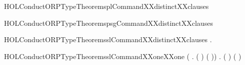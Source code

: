 \begin{SaveVerbatim}{HOLConductORPTypeTheoremsplCommandXXdistinctXXclauses}
\HOLTokenTurnstile{}  \HOLSymConst{\HOLTokenNotEqual{}}  \HOLSymConst{\HOLTokenConj{}}  \HOLSymConst{\HOLTokenNotEqual{}}  \HOLSymConst{\HOLTokenConj{}}
    \HOLSymConst{\HOLTokenNotEqual{}}  \HOLSymConst{\HOLTokenConj{}}  \HOLSymConst{\HOLTokenNotEqual{}}  \HOLSymConst{\HOLTokenConj{}}
    \HOLSymConst{\HOLTokenNotEqual{}}  \HOLSymConst{\HOLTokenConj{}}  \HOLSymConst{\HOLTokenNotEqual{}} 
\end{SaveVerbatim}
\newcommand{\HOLConductORPTypeTheoremsplCommandXXdistinctXXclauses}{\UseVerbatim{HOLConductORPTypeTheoremsplCommandXXdistinctXXclauses}}
\begin{SaveVerbatim}{HOLConductORPTypeTheoremspsgCommandXXdistinctXXclauses}
\HOLTokenTurnstile{}  \HOLSymConst{\HOLTokenNotEqual{}} 
\end{SaveVerbatim}
\newcommand{\HOLConductORPTypeTheoremspsgCommandXXdistinctXXclauses}{\UseVerbatim{HOLConductORPTypeTheoremspsgCommandXXdistinctXXclauses}}
\begin{SaveVerbatim}{HOLConductORPTypeTheoremsslCommandXXdistinctXXclauses}
\HOLTokenTurnstile{} \HOLSymConst{\HOLTokenForall{}} .   \HOLSymConst{\HOLTokenNotEqual{}}  
\end{SaveVerbatim}
\newcommand{\HOLConductORPTypeTheoremsslCommandXXdistinctXXclauses}{\UseVerbatim{HOLConductORPTypeTheoremsslCommandXXdistinctXXclauses}}
\begin{SaveVerbatim}{HOLConductORPTypeTheoremsslCommandXXoneXXone}
\HOLTokenTurnstile{} (\HOLSymConst{\HOLTokenForall{}} . (  \HOLSymConst{=}  ) \HOLSymConst{\HOLTokenEquiv{}} ( \HOLSymConst{=} )) \HOLSymConst{\HOLTokenConj{}}
   \HOLSymConst{\HOLTokenForall{}} . (  \HOLSymConst{=}  ) \HOLSymConst{\HOLTokenEquiv{}} ( \HOLSymConst{=} )
\end{SaveVerbatim}
